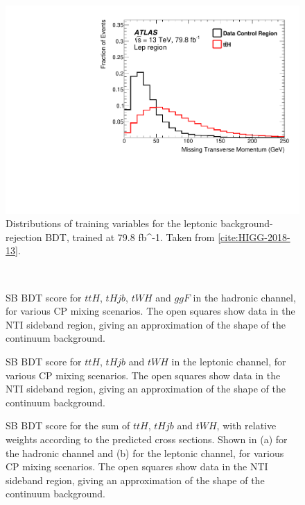 \begin{figure}
	\includegraphics[width=0.31\linewidth]{figures/tthcp_chapter/figaux_11g.pdf}
	\caption{Distributions of training variables for the leptonic background-rejection BDT, trained at 79.8 fb^{-1}. Taken from \ref{cite:HIGG-2018-13}.}
	\label{fig:SBBDTvarslep}
\end{figure}

\ifffalse
\begin{figure}[htbp]
  \centering
         \\
  \caption{SB BDT score for $ttH$, $tHjb$, $tWH$ and $ggF$ in the hadronic channel, for various CP mixing scenarios. The open squares show data in the NTI sideband region, giving an approximation of the shape of the continuum background.  }
  \label{fig:moriondhad}
\end{figure}

\begin{figure}[htbp]
  \centering
  \caption{SB BDT score for $ttH$, $tHjb$ and $tWH$ in the leptonic channel, for various CP mixing scenarios. The open squares show data in the NTI sideband region, giving an approximation of the shape of the continuum background.  }
  \label{fig:moriondlep}
\end{figure}
\fi

\begin{figure}[htbp]
  \centering
  \caption{SB BDT score for the sum of $ttH$, $tHjb$ and $tWH$, with relative weights according to the predicted cross sections. Shown in (a) for the hadronic channel and (b) for the leptonic channel, for various CP mixing scenarios. The open squares show data in the NTI sideband region, giving an approximation of the shape of the continuum background.  }
  \label{fig:moriondtotal}
\end{figure}


